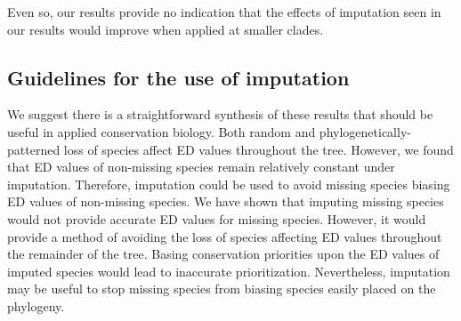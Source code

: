 \documentclass[12pt,english]{article}
\begin{document}
Even so, our results provide no indication
that the effects of imputation seen in our results would improve when
applied at smaller clades.

\subsection*{Guidelines for the use of imputation}
We suggest there is a straightforward synthesis of these results that should be
useful in applied conservation biology. Both random and
phylogenetically-patterned loss of species affect ED values throughout the tree.
However, we found that ED values of non-missing species remain relatively
constant under imputation. Therefore, imputation could be used to avoid missing
species biasing ED values of non-missing species. We have shown that imputing
missing species would not provide accurate ED values for missing species.
However, it would provide a method of avoiding the loss of species affecting ED
values throughout the remainder of the tree. Basing conservation priorities upon
the ED values of imputed species would lead to inaccurate prioritization.
Nevertheless, imputation may be useful to stop missing species from biasing
species easily placed on the phylogeny.
\end{document}
